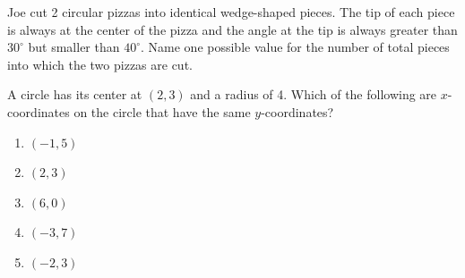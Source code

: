 \begin{multienumerate}
{Joe cut 2 circular pizzas into identical wedge-shaped pieces. The tip of each piece is always at the center of the pizza and the angle at the tip is always greater than $30^\circ$ but smaller than $40^\circ$. Name one possible value for the number of total pieces into which the two pizzas are cut.
}{\medium

A circle has its center at $(2,3)$ and a radius of 4. Which of the following are $x$-coordinates on the circle that have the same $y$-coordinates?

\begin{enumerate}[label=(\Alph*)]
\item $(-1,5)$
\item $(2,3)$
\item $(6,0)$
\item $(-3,7)$
\item $(-2,3)$
\end{enumerate}}

\vfill
{}
\end{multienumerate}
